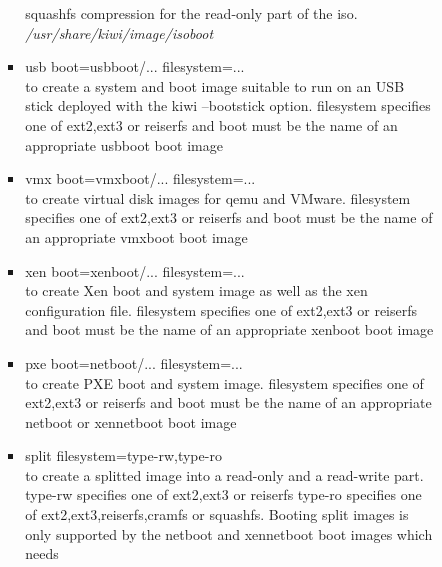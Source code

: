 \begin{itemize}
\begin{enumerate}
\begin{itemize}
\begin{itemize}
                              squashfs compression for the read-only part
                              of the iso.
                              \textit{/usr/share/kiwi/image/isoboot}
                        \item usb boot=usbboot/... filesystem=...\\
                              to create a system and boot image suitable
                              to run on an USB stick deployed with the kiwi
                              --bootstick option. filesystem specifies one of 
                              ext2,ext3 or reiserfs and boot must be
                              the name of an appropriate usbboot boot image  
                        \item vmx boot=vmxboot/... filesystem=...\\
                              to create virtual disk images for qemu and
                              VMware. filesystem specifies one of ext2,ext3 or
                              reiserfs and boot must be the name of an
                              appropriate vmxboot boot image
                        \item xen boot=xenboot/... filesystem=...\\
                              to create Xen boot and system image as well
                              as the xen configuration file. filesystem
                              specifies one of ext2,ext3 or reiserfs and
                              boot must be the name of an appropriate
                              xenboot boot image
						\item pxe boot=netboot/... filesystem=...\\
							  to create PXE boot and system image. filesystem
                              specifies one of ext2,ext3 or reiserfs and
                              boot must be the name of an appropriate
                              netboot or xennetboot boot image
                        \item split filesystem=type-rw,type-ro\\
                              to create a splitted image into a read-only
                              and a read-write part. type-rw specifies one of
                              ext2,ext3 or reiserfs type-ro specifies one
                              of ext2,ext3,reiserfs,cramfs or squashfs.
                              Booting split images is only supported by the
                              netboot and xennetboot boot images which needs

\end{itemize}
\end{itemize}
\end{enumerate}
\end{itemize}
